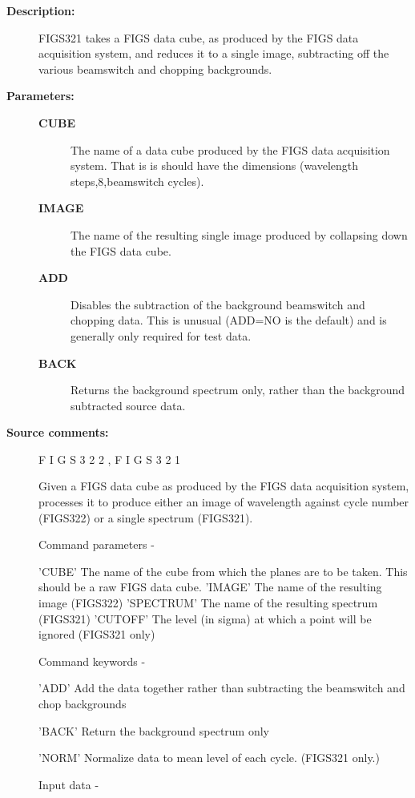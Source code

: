 \begin{description}
\begin{description}
\item [\textbf{Description:}]
 FIGS321 takes a FIGS data cube, as produced by the FIGS data
 acquisition system, and reduces it to a single image, subtracting
 off the various beamswitch and chopping backgrounds.

\item [\textbf{Parameters:}]
\begin{description}
\item [\textbf{CUBE}]
 The name of a data cube produced by the FIGS data
 acquisition system.  That is is should have the
 dimensions (wavelength steps,8,beamswitch cycles).
\item [\textbf{IMAGE}]
 The name of the resulting single image produced
 by collapsing down the FIGS data cube.
\item [\textbf{ADD}]
 Disables the subtraction of the background beamswitch
 and chopping data.  This is unusual (ADD=NO is the
 default) and is generally only required for test data.
\item [\textbf{BACK}]
 Returns the background spectrum only, rather than the
 background subtracted source data.
\end{description}

\item [\textbf{Source comments:}]
\begin{terminalv}
 F I G S 3 2 2 ,   F I G S 3 2 1

 Given a FIGS data cube as produced by the FIGS data acquisition
 system, processes it to produce either an image of wavelength
 against cycle number (FIGS322) or a single spectrum (FIGS321).

 Command parameters -

 'CUBE'     The name of the cube from which the planes
            are to be taken.  This should be a raw FIGS data
            cube.
 'IMAGE'    The name of the resulting image (FIGS322)
 'SPECTRUM' The name of the resulting spectrum (FIGS321)
 'CUTOFF'   The level (in sigma) at which a point will
            be ignored (FIGS321 only)

 Command keywords -

 'ADD'      Add the data together rather than subtracting the
            beamswitch and chop backgrounds

 'BACK'     Return the background spectrum only

 'NORM'     Normalize data to mean level of each cycle.
            (FIGS321 only.)

 Input data -


\end{terminalv}
\end{description}
\end{description}
